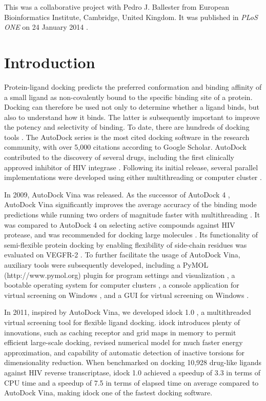 This was a collaborative project with Pedro J. Ballester from European Bioinformatics Institute, Cambridge, United Kingdom. It was published in \textit{PLoS ONE} on 24 January 2014 \citep{1362}.


\section{Introduction}

Protein-ligand docking predicts the preferred conformation and binding affinity of a small ligand as non-covalently bound to the specific binding site of a protein. Docking can therefore be used not only to determine whether a ligand binds, but also to understand how it binds. The latter is subsequently important to improve the potency and selectivity of binding. To date, there are hundreds of docking tools \citep{493,922}. The AutoDock series \citep{597,596,595} is the most cited docking software in the research community, with over 5,000 citations according to Google Scholar. AutoDock contributed to the discovery of several drugs, including the first clinically approved inhibitor of HIV integrase \citep{1169}. Following its initial release, several parallel implementations were developed using either multithreading or computer cluster \citep{115,560,782}.%

In 2009, AutoDock Vina \citep{595} was released. As the successor of AutoDock 4 \citep{596}, AutoDock Vina significantly improves the average accuracy of the binding mode predictions while running two orders of magnitude faster with multithreading \citep{595}. It was compared to AutoDock 4 on selecting active compounds against HIV protease, and was recommended for docking large molecules \citep{556}. Its functionality of semi-flexible protein docking by enabling flexibility of side-chain residues was evaluated on VEGFR-2 \citep{1084}. To further facilitate the usage of AutoDock Vina, auxiliary tools were subsequently developed, including a PyMOL (http://www.pymol.org) plugin for program settings and visualization \citep{609}, a bootable operating system for computer clusters \citep{773}, a console application for virtual screening on Windows \citep{1268}, and a GUI for virtual screening on Windows \citep{1250}.

In 2011, inspired by AutoDock Vina, we developed idock 1.0 \citep{1153}, a multithreaded virtual screening tool for flexible ligand docking. idock introduces plenty of innovations, such as caching receptor and grid maps in memory to permit efficient large-scale docking, revised numerical model for much faster energy approximation, and capability of automatic detection of inactive torsions for dimensionality reduction. When benchmarked on docking 10,928 drug-like ligands against HIV reverse transcriptase, idock 1.0 achieved a speedup of 3.3 in terms of CPU time and a speedup of 7.5 in terms of elapsed time on average compared to AutoDock Vina, making idock one of the fastest docking software.


